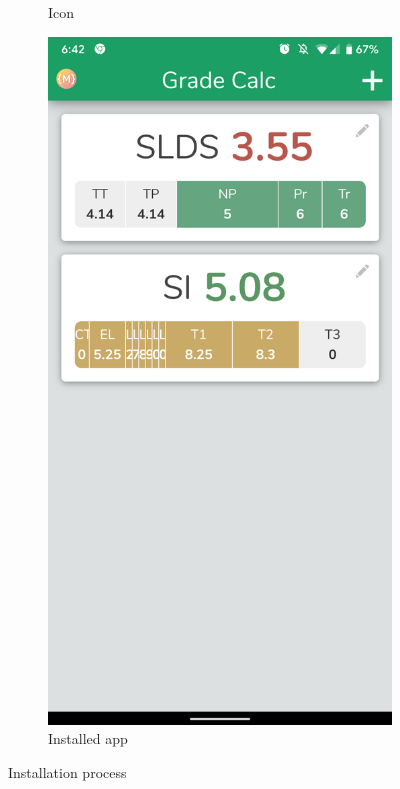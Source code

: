 \begin{figure}[ht!]
\begin{subfigure}[b]{0.25\textwidth-0.1cm}
        \caption{Icon}
    \end{subfigure}
    \hfill
    \begin{subfigure}[b]{0.25\textwidth-0.1cm}
        \centering
        \includegraphics[width=\textwidth]{media/screenshots/screenshot-install-standalone.png}
        \caption{Installed app}
    \end{subfigure}
    \caption{Installation process}
    \label{fig:install}
\end{figure}
\vfill

